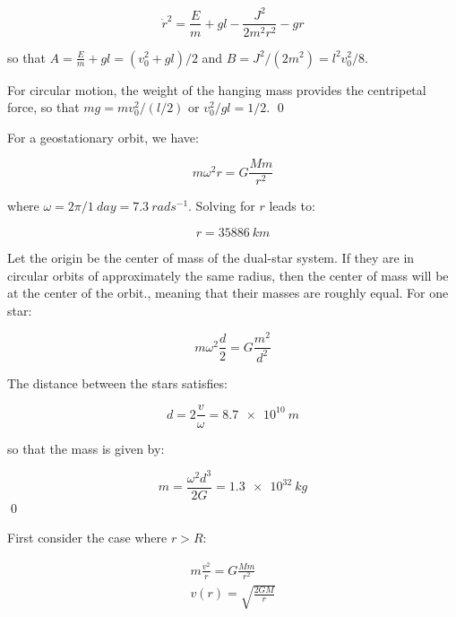 \documentclass[12pt]{article}
\begin{document}
\begin{equation}
    \dot{r}^{2} = \frac{E}{m} + gl - \frac{J^{2}}{2m^{2}r^{2}} - gr
\end{equation}

so that $A = \frac{E}{m} + gl = (v_{0}^{2} + gl)/2$ and $B = J^{2}/(2m^{2}) = l^{2}v_{0}^{2}/8$.

For circular motion, the weight of the hanging mass provides the centripetal force, so that $mg = mv_{0}^{2}/(l/2)$ or $v_{0}^{2}/gl = 1/2$.
\qed



For a geostationary orbit, we have:

\begin{equation}
    m \omega^{2} r = G \frac{Mm}{r^{2}}
\end{equation}

where $\omega = 2\pi/\qty{1}{day} = \qty{7.3}{rad s^{-1}}$. Solving for $r$ leads to:

\begin{equation}
    r = \qty{35886}{km}
\end{equation}

Let the origin be the center of mass of the dual-star system. If they are in circular orbits of approximately the same radius, then the center of mass will be at the center of the orbit., meaning that their masses are roughly equal. For one star:

\begin{equation}
    m \omega^{2} \frac{d}{2} = G \frac{m^{2}}{d^{2}}
\end{equation}

The distance between the stars satisfies:

\begin{equation}
    d = 2\frac{v}{\omega} = \qty{8.7e10}{m}
\end{equation}

so that the mass is given by:

\begin{equation}
    m = \frac{\omega^{2}d^{3}}{2G} = \qty{1.3e32}{kg}
\end{equation}
\qed


First consider the case where $r > R$:

\begin{equation}
\begin{split}
    m \frac{v^{2}}{r} = G \frac{Mm}{r^{2}} \\
    v(r) = \sqrt{\frac{2GM}{r}}
\end{split}
\end{equation}
\end{document}
